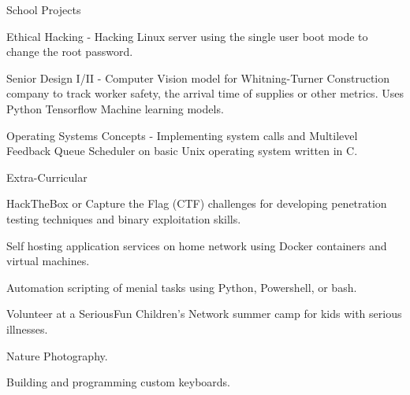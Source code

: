 \documentclass{resume} %
\begin{document}
\begin{rSection}{School Projects} \itemsep -3pt
	\item Ethical Hacking - Hacking Linux server using the single user boot mode to change the root password.
	\item Senior Design I/II - Computer Vision model for Whitning-Turner Construction company to track worker safety, the arrival time of supplies or other metrics. Uses Python Tensorflow Machine learning models.
	\item Operating Systems Concepts - Implementing system calls and Multilevel Feedback Queue Scheduler on basic Unix operating system written in C.
\end{rSection}

\begin{rSection}{Extra-Curricular} \itemsep -3pt
	\item HackTheBox or Capture the Flag (CTF) challenges for developing penetration testing techniques and binary exploitation skills.
	\item Self hosting application services on home network using Docker containers and virtual machines.
	\item Automation scripting of menial tasks using Python, Powershell, or bash.
	\item Volunteer at a SeriousFun Children's Network summer camp for kids with serious illnesses.
	\item Nature Photography.
	\item Building and programming custom keyboards.
\end{rSection}
\end{document}
